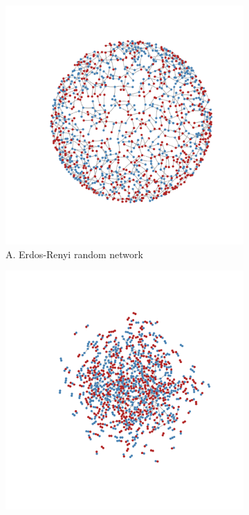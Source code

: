 \documentclass[man, 12pt, a4paper, nolmodern, noextraspace]{apa6}
\begin{document}
\begin{figure}
\captionsetup[subfigure]{labelfont=bf,textfont=normalfont,singlelinecheck=on}
    \centering
    \begin{subfigure}[t]{0.45\textwidth}
        \centering
        \includegraphics[trim={2cm 2cm 2cm 2cm}, clip, width=\linewidth]{draft/network_plots1.pdf} 
        \caption*{A. Erdos-Renyi random network}
        \label{fig1:random}
    \end{subfigure}
    \hfill
    \begin{subfigure}[t]{0.45\textwidth}
        \centering
        \includegraphics[trim={2cm 2cm 2cm 2cm}, clip, width=\linewidth]{draft/network_plots2.pdf} 

\end{subfigure}
\end{figure}
\end{document}
